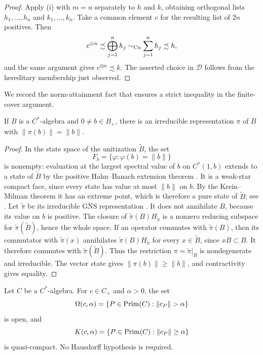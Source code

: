 \begin{proof}
Apply \textup{(i)} with $m=n$ separately to $h$ and $k$, obtaining
orthogonal lists $h_1,\ldots,h_n$ and $k_1,\ldots,k_n$.
Take a common element $c$ for the resulting list of $2n$ positives.
Then
\[
 c^{\oplus n}\precsim\bigoplus_{j=1}^n h_j
 \sim_{\mathrm{Cu}}\sum_{j=1}^n h_j\precsim h,
\]
and the same argument gives $c^{\oplus n}\precsim k$.
The asserted choice in $\mathcal D$ follows from the hereditary
membership just observed.
\end{proof}

We record the norm-attainment fact that ensures a strict inequality
in the finite-cover argument.

\begin{lemma}\label{lem:purestateattainment}
If $B$ is a $C^*$-algebra and $0\ne b\in B_+$, there is an
irreducible representation $\pi$ of $B$ with
$\|\pi(b)\|=\|b\|$.
\end{lemma}

\begin{proof}
In the state space of the unitization $\widetilde B$, the set
\[
 F_b=\{\varphi:\varphi(b)=\|b\|\}
\]
is nonempty: evaluation at the largest spectral value of $b$ on
$C^*(1,b)$ extends to a state of $\widetilde B$ by the positive
Hahn--Banach extension theorem \cite[II.6.3.1]{Blackadar}.  It is a weak-star compact face,
since every state has value at most $\|b\|$ on $b$.  By the
Krein--Milman theorem it has an extreme point, which is therefore
a pure state of $\widetilde B$; see \cite[II.6.3.2--3]{Blackadar}.
Let $\widetilde\pi$ be its irreducible GNS representation
\cite[II.6.4.8]{Blackadar}.  It does not annihilate $B$, because
its value on $b$ is positive.  The closure of
$\widetilde\pi(B)H_{\widetilde\pi}$ is a nonzero reducing subspace
for $\widetilde\pi(\widetilde B)$, hence the whole space.
If an operator commutes with $\widetilde\pi(B)$, then its commutator
with $\widetilde\pi(x)$ annihilates $\widetilde\pi(B)H_{\widetilde\pi}$
for every $x\in\widetilde B$, since $xB\subset B$.
It therefore commutes with $\widetilde\pi(\widetilde B)$.
Thus the restriction $\pi=\widetilde\pi|_B$ is nondegenerate and
irreducible.  The vector state gives
$\|\pi(b)\|\ge\|b\|$, and contractivity gives equality.
\end{proof}

\begin{lemma}\label{lem:primitive-compactness}
Let $C$ be a $C^*$-algebra.  For $c\in C_+$ and $\alpha>0$, the set
\[
 \Omega(c,\alpha)=\{P\in\Prim(C):\|c_P\|>\alpha\}
\]
is open, and
\[
 K(c,\alpha)=\{P\in\operatorname{Prim}(C):\|c_P\|\ge\alpha\}
\]
is quasi-compact.  No Hausdorff hypothesis is required.
\end{lemma}

